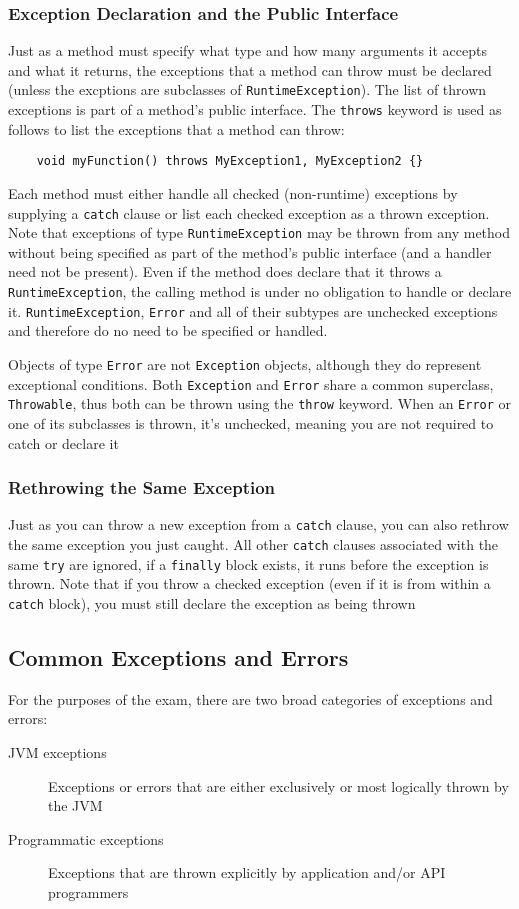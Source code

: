\subsubsection{Exception Declaration and the Public Interface}
Just as a method must specify what type and how many arguments it accepts and 
what it returns, the exceptions that a method can throw must be declared 
(unless the excptions are subclasses of \verb#RuntimeException#). The list of 
thrown exceptions is part of a method's public interface. The \verb#throws# 
keyword is used as follows to list the exceptions that a method can throw:
\begin{verbatim}
    void myFunction() throws MyException1, MyException2 {}
\end{verbatim}
Each method must either handle all checked (non-runtime) exceptions by 
supplying a \verb#catch# clause or list each checked exception as a thrown 
exception. Note that exceptions of type \verb#RuntimeException# may be thrown 
from any method without being specified as part of the method's public 
interface (and a handler need not be present). Even if the method does declare 
that it throws a \verb#RuntimeException#, the calling method is under no 
obligation to handle or declare it. \verb#RuntimeException#, \verb#Error# and 
all of their subtypes are unchecked exceptions and therefore do no need to be 
specified or handled.

Objects of type \verb#Error# are not \verb#Exception# objects, although they do 
represent exceptional conditions. Both \verb#Exception# and \verb#Error# share 
a common superclass, \verb#Throwable#, thus both can be thrown using the 
\verb#throw# keyword. When an \verb#Error# or one of its subclasses is thrown, 
it's unchecked, meaning you are not required to catch or declare it

\subsubsection{Rethrowing the Same Exception}
Just as you can throw a new exception from a \verb#catch# clause, you can also 
rethrow the same exception you just caught. All other \verb#catch# clauses 
associated with the same \verb#try# are ignored, if a \verb#finally# block 
exists, it runs before the exception is thrown. Note that if you throw a 
checked exception (even if it is from within a \verb#catch# block), you must 
still declare the exception as being thrown

\subsection{Common Exceptions and Errors}
For the purposes of the exam, there are two broad categories of exceptions and 
errors:
\begin{description}
    \item[JVM exceptions] Exceptions or errors that are either exclusively or 
    most logically thrown by the JVM
    \item[Programmatic exceptions] Exceptions that are thrown explicitly by 
    application and/or API programmers
\end{description}

